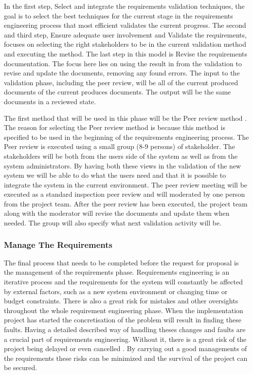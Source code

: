 \documentclass[a4paper]{article}
\begin{document}
In the first step, Select and integrate the requirements validation techniques, the goal is to select the best techniques for the current stage in the requirements engineering process that most efficient validates the current progress. The second and third step, Ensure adequate user involvement and Validate the requirements, focuses on selecting the right stakeholders to be in the current validation method and executing the method. The last step in this model is Revise the requirements documentation. The focus here lies on using the result in from the validation to revise and update the documents, removing any found errors. The input to the validation phase, including the peer review, will be all of the current produced documents of the current produces documents. The output will be the same documents in a reviewed state\cite{gott261263}.

The first method that will be used in this phase will be the Peer review method \cite{gott263269}. The reason for selecting the Peer review method is because this method is specified to be used in the beginning of the requirements engineering process\cite{gott280}. The Peer review is executed using a small group (8-9 persons) of stakeholder. The stakeholders will be both from the users side of the system as well as from the system administrators. By having both these views in the validation of the new system we will be able to do what the users need and that it is possible to integrate the system in the current environment. The peer review meeting will be executed as a standard inspection peer review and will moderated by one person from the project team. After the peer review has been executed, the project team along with the moderator will revise the documents and update them when needed. The group will also specify what next validation activity will be.

\subsubsection{Manage The Requirements}
\label{subsub:manage_the_requirements}
The final process that needs to be completed before the request for proposal is the management of the requirements phase. Requirements engineering is an iterative process and the requirements for the system will constantly be affected by external factors, such as a new system environment or changing time or budget constraints. There is also a great risk for mistakes and other oversights throughout the whole requirement engineering phase. When the implementation project has started the concretisation of the problem will result in finding these faults. Having a detailed described way of handling theses changes and faults are a crucial part of requirements engineering\cite{gott281}. Without it, there is a great risk of the project being delayed or even cancelled \cite{gott281}. By carrying out a good managements of the requirements these risks can be minimized and the survival of the project can be secured. 
\end{document}
